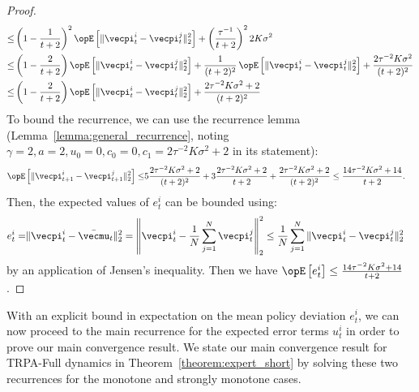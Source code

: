 \begin{proof}
\begin{align*}
    \leq & \left(1 - \frac{1}{t+2}\right)^2 \Exop\left[\|  \vecpi^i_t - \vecpi^j_t \|_2^2\right] + \left(\frac{\tau^{-1}}{t+2}\right)^2 2K\sigma^2 \\
    \leq & \left(1 - \frac{2}{t+2}\right) \Exop\left[\|  \vecpi^i_t - \vecpi^j_t \|_2^2\right] + \frac{1}{(t+2)^2} \Exop\left[\|  \vecpi^i_t - \vecpi^j_t \|_2^2\right] + \frac{2\tau^{-2}K\sigma^2}{(t+2)^2} \\
    \leq & \left(1 - \frac{2}{t+2}\right) \Exop\left[\|  \vecpi^i_t - \vecpi^j_t \|_2^2\right] + \frac{2\tau^{-2}K\sigma^2 + 2}{(t+2)^2}
\end{align*}
To bound the recurrence, we can use the recurrence lemma (Lemma~\ref{lemma:general_recurrence}, noting $\gamma=2, a = 2, u_0 = 0, c_0 = 0, c_1 = 2\tau^{-2}K\sigma^2 + 2$ in its statement):
\begin{align*}
    \Exop \left[ \| \vecpi^i_{t+1} - \vecpi^j_{t+1} \|_2^2 \right] \leq & 5\frac{2\tau^{-2}K\sigma^2 + 2}{(t+2)^2} + 3\frac{2\tau^{-2}K\sigma^2 + 2}{t+2} + \frac{2\tau^{-2}K\sigma^2 + 2}{(t+2)^2} \leq \frac{14 \tau^{-2} K\sigma^2 + 14}{t+2}.
\end{align*}
Then, the expected values of $e_t^i$ can be bounded using:
\begin{align*}
     e_t^i = &\|\vecpi^i_t - \bar{\vecmu}_t \|_2^2 
     =  \left\|\vecpi^i_t - \frac{1}{N} \sum_{j=1}^N \vecpi^j_t  \right\|_2^2 
     \leq \frac{1}{N} \sum_{j=1}^N \| \vecpi^i_t - \vecpi^j_t \|_2^2
\end{align*}
by an application of Jensen's inequality.
Then we have $\Exop\left[e_t^i\right] \leq \frac{14 \tau^{-2} K\sigma^2 + 14}{t+2}$.
\end{proof}

With an explicit bound in expectation on the mean policy deviation $e_t^i$, we can now proceed to the main recurrence for the expected error terms $u_t^i$ in order to prove our main convergence result.
We state our main convergence result for TRPA-Full dynamics in Theorem~\ref{theorem:expert_short} by solving these two recurrences for the monotone and strongly monotone cases.

